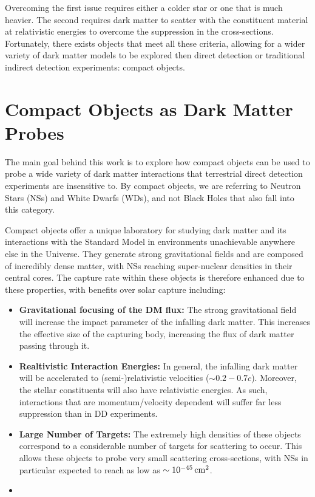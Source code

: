 Overcoming the first issue requires either a colder star or one that is much heavier. The second requires dark matter to scatter with the constituent material at relativistic energies to overcome the suppression in the cross-sections. 
Fortunately, there exists objects that meet all these criteria, allowing for a wider variety of dark matter models to be explored then direct detection or traditional indirect detection experiments: compact objects.

\section{Compact Objects as Dark Matter Probes}

The main goal behind this work is to explore how compact objects can be used to probe a wide variety of dark matter interactions that terrestrial direct detection experiments are insensitive to. By compact objects, we are referring to Neutron Stars (NSs) and White Dwarfs (WDs), and not Black Holes that also fall into this category.


Compact objects offer a unique laboratory for studying dark matter and its interactions with the Standard Model in environments unachievable anywhere else in the Universe. They generate strong gravitational fields and are composed of incredibly dense matter, with NSs reaching super-nuclear densities in their central cores. The capture rate within these objects is therefore enhanced due to these properties, with benefits over solar capture including:


\begin{itemize}
\item \textbf{Gravitational focusing of the DM flux:} The strong gravitational field will increase the impact parameter of the infalling dark matter. This increases the effective size of the capturing body, increasing the flux of dark matter passing through it. 

\item \textbf{Realtivistic Interaction Energies:} In general, the infalling dark matter will be accelerated to (semi-)relativistic velocities ($\sim 0.2 - 0.7 c$). Moreover, the stellar constituents will also have relativistic energies. As such, interactions that are momentum/velocity dependent will suffer far less suppression than in DD experiments. 

\item \textbf{Large Number of Targets:} The extremely high densities of these objects correspond to a considerable number of targets for scattering to occur. This allows these objects to probe very small scattering cross-sections, with NSs in particular expected to reach as low as $\sim 10^ {-45}{\rm \,cm}^2$. 

\item \textbf{}
\end{itemize}

